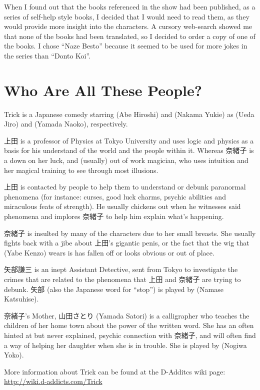 \par When I found out that the books referenced in the show had been published, as a series of self-help style books, I decided that I would need to read them, as they would provide more insight into the characters. A cursory web-search showed me that none of the books had been translated, so I decided to order a copy of one of the books. I chose ``Naze Besto'' because it seemed to be used for more jokes in the series than ``Donto Koi''.


\section*{Who Are All These People?}

Trick is a Japanese comedy starring  (Abe Hiroshi) and  (Nakama Yukie) as  (Ueda Jiro) and  (Yamada Naoko), respectively.

\par 上田 is a professor of Physics at Tokyo University and uses logic and physics as a basis for his understand of the world and the people within it. Whereas 奈緒子 is a down on her luck, and (usually) out of work magician, who uses intuition and her magical training to see through most illusions.

\par 上田 is contacted by people to help them to understand or debunk paranormal phenomena (for instance: curses, good luck charms, psychic abilities and miraculous feats of strength). He usually chickens out when he witnesses said phenomena and implores 奈緒子 to help him explain what's happening.

\par 奈緒子 is insulted by many of the characters due to her small breasts. She usually fights back with a jibe about 上田's gigantic penis, or the fact that the wig that  (Yabe Kenzo) wears is has fallen off or looks obvious or out of place.

\par 矢部謙三 is an inept Assistant Detective, sent from Tokyo to investigate the crimes that are related to the phenomena that 上田 and 奈緒子 are trying to debunk. 矢部 (also the Japanese word for ``stop'') is played by  (Namase Katsuhise).

\par 奈緒子's Mother, 山田さとり (Yamada Satori) is a calligrapher who teaches the children of her home town about the power of the written word. She has an often hinted at but never explained, psychic connection with 奈緒子, and will often find a way of helping her daughter when she is in trouble. She is played by  (Nogiwa Yoko).

\par More information about Trick can be found at the D-Additcs wiki page: \url{http://wiki.d-addicts.com/Trick}

\theendnotes